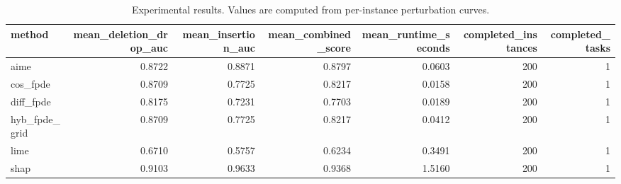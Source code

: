 \begin{table}[t]
\caption{Experimental results. Values are computed from per-instance perturbation curves.}
\label{tab:main_results_computed}
\centering
\begin{tabular}{lrrrrrr}
\toprule
method & mean\_deletion\_drop\_auc & mean\_insertion\_auc & mean\_combined\_score & mean\_runtime\_seconds & completed\_instances & completed\_tasks \\
\midrule
aime & 0.8722 & 0.8871 & 0.8797 & 0.0603 & 200 & 1 \\
cos\_fpde & 0.8709 & 0.7725 & 0.8217 & 0.0158 & 200 & 1 \\
diff\_fpde & 0.8175 & 0.7231 & 0.7703 & 0.0189 & 200 & 1 \\
hyb\_fpde\_grid & 0.8709 & 0.7725 & 0.8217 & 0.0412 & 200 & 1 \\
lime & 0.6710 & 0.5757 & 0.6234 & 0.3491 & 200 & 1 \\
shap & 0.9103 & 0.9633 & 0.9368 & 1.5160 & 200 & 1 \\
\bottomrule
\end{tabular}

\end{table}
